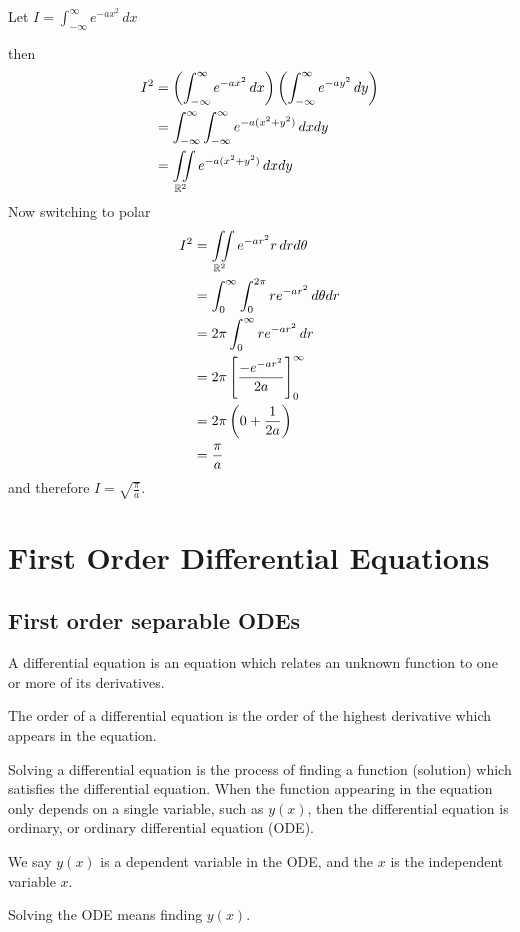\documentclass[10pt, a4paper]{article}
\begin{document}
Let $I = \int_{-\infty}^{\infty}e ^ {-ax ^ 2}\,dx$

then
\begin{align*}
I ^ 2 &= \left(\int_{-\infty}^{\infty}e ^ {-ax ^ 2}\,dx\right)\left(\int_{-\infty}^{\infty}e ^ {-ay ^ 2}\,dy\right) \\
&= \int_{-\infty}^{\infty}\int_{-\infty}^{\infty}e ^ {-a(x ^ 2 + y ^ 2)}\,dxdy \\
&= \iint\limits_{\mathbb{R} ^ 2}e ^ {-a(x ^ 2 + y ^ 2)}\,dxdy
\end{align*}
Now switching to polar
\begin{align*}
    I ^ 2 &= \iint\limits_{\mathbb{R} ^ 2}e ^ {-ar ^ 2}r\,drd\theta \\
    &= \int_0^{\infty}\int_{0}^{2\pi}re ^ {-ar ^ 2}\,d\theta dr \\
    &= 2\pi\int_{0}^{\infty}re ^ {-ar ^ 2}\,dr \\
    &= 2\pi\left[\frac{-e ^ {-ar ^ 2}}{2a}\right]_{0}^{\infty} \\
    &= 2\pi\left(0 + \frac{1}{2a}\right) \\
    &= \frac{\pi}{a}
\end{align*}
and therefore $I = \sqrt{\frac{\pi}{a}}$.

\newpage

\section{First Order Differential Equations}

\subsection{First order separable ODEs}
A differential equation is an equation which relates an unknown function to one or more of its derivatives.

The order of a differential equation is the order of the highest derivative which appears in the equation.

Solving a differential equation is the process of finding a function
(solution)
which satisfies the differential equation.
When the function appearing in the equation only depends on a single variable,
such as $y(x)$,
then the differential equation is ordinary,
or ordinary differential equation
(ODE).

We say $y(x)$ is a dependent variable in the ODE,
and the $x$ is the independent variable $x$.

Solving the ODE means finding $y(x)$.
\end{document}
